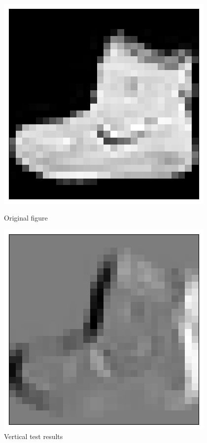 \documentclass[a4paper,12pt]{article}
\begin{document}
\centering %
\begin{figure}[htbp]  %
    \centering
    \begin{minipage}{0.45\textwidth}
        \centering
        \includegraphics[width=\linewidth]{images/lab2_1_ori.png}
        \caption*{Original figure}
    \end{minipage}
    \hspace{0.05\textwidth}  %
    \begin{minipage}{0.45\textwidth}
        \centering
        \includegraphics[width=\linewidth]{images/lab2_1_ver.png}
        \caption*{Vertical test results}
    \end{minipage}


\end{figure}
\end{document}
